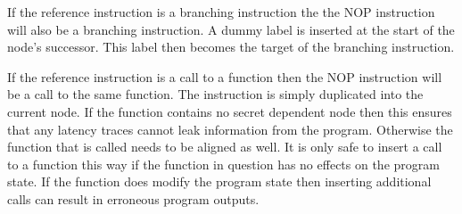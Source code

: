 If the reference instruction is a branching instruction the the NOP instruction will also be a branching instruction. 
A dummy label is inserted at the start of the node's successor. This label then becomes the target of the branching instruction. 

If the reference instruction is a call to a function then the NOP instruction will be  a call to the same function. The instruction is simply duplicated into the current node. 
If the function contains no secret dependent node then this ensures that any latency traces cannot leak information from the program. Otherwise the function that is called needs to be aligned as well. 
It is only safe to insert a call to a function this way if the function in question has no effects on the program state. If the function does modify the program state then inserting additional calls can 
result in erroneous program outputs. 


